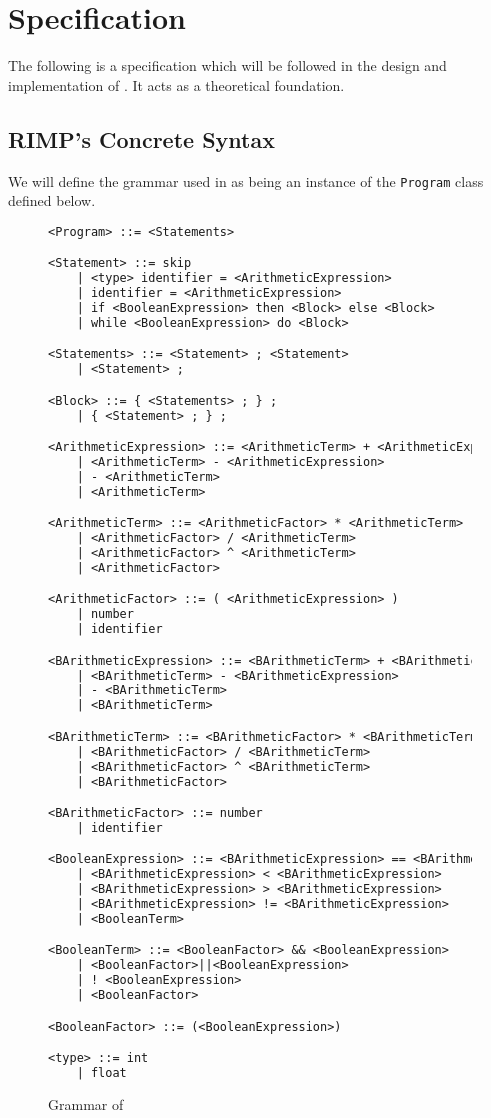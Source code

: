 \chapter{Specification}

The following is a specification which will be followed in the design and implementation of \rimp. It acts as a theoretical foundation. 

\section{RIMP's Concrete Syntax}

We will define the grammar used in \rimp as being an instance of the \lstinline{Program} class defined below.
\begin{figure}
    \centering
    \begin{lstlisting}[language=TeX,label={lst:grammar}, basicstyle=\small]
<Program> ::= <Statements>

<Statement> ::= skip
    | <type> identifier = <ArithmeticExpression>
    | identifier = <ArithmeticExpression>
    | if <BooleanExpression> then <Block> else <Block>
    | while <BooleanExpression> do <Block>

<Statements> ::= <Statement> ; <Statement>
    | <Statement> ;

<Block> ::= { <Statements> ; } ;
    | { <Statement> ; } ;

<ArithmeticExpression> ::= <ArithmeticTerm> + <ArithmeticExpression>
    | <ArithmeticTerm> - <ArithmeticExpression>
    | - <ArithmeticTerm>
    | <ArithmeticTerm>

<ArithmeticTerm> ::= <ArithmeticFactor> * <ArithmeticTerm>
    | <ArithmeticFactor> / <ArithmeticTerm>
    | <ArithmeticFactor> ^ <ArithmeticTerm>
    | <ArithmeticFactor>

<ArithmeticFactor> ::= ( <ArithmeticExpression> )
    | number
    | identifier

<BArithmeticExpression> ::= <BArithmeticTerm> + <BArithmeticExpression>
    | <BArithmeticTerm> - <BArithmeticExpression>
    | - <BArithmeticTerm>
    | <BArithmeticTerm>

<BArithmeticTerm> ::= <BArithmeticFactor> * <BArithmeticTerm>
    | <BArithmeticFactor> / <BArithmeticTerm>
    | <BArithmeticFactor> ^ <BArithmeticTerm>
    | <BArithmeticFactor>

<BArithmeticFactor> ::= number
    | identifier

<BooleanExpression> ::= <BArithmeticExpression> == <BArithmeticExpression>
    | <BArithmeticExpression> < <BArithmeticExpression>
    | <BArithmeticExpression> > <BArithmeticExpression>
    | <BArithmeticExpression> != <BArithmeticExpression>
    | <BooleanTerm>

<BooleanTerm> ::= <BooleanFactor> && <BooleanExpression>
    | <BooleanFactor>||<BooleanExpression>
    | ! <BooleanExpression>
    | <BooleanFactor>

<BooleanFactor> ::= (<BooleanExpression>)

<type> ::= int
    | float
\end{lstlisting}
    \caption{Grammar of \rimplang}
    \label{fig:grammar}
\end{figure}

